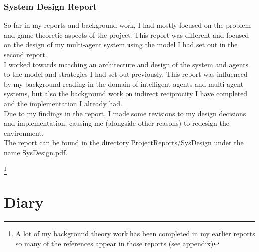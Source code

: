 \documentclass[]{final_report}
\begin{document}
\subsection{System Design Report}
\label{sub:sysdesign}
So far in my reports and background work, I had mostly focused on the problem and game-theoretic aspects of the project. This report was different and focused on the design of my multi-agent system using the model I had set out in the second report.\\
I worked towards matching an architecture and design of the system and agents to the model and strategies I had set out previously. This report was influenced by my background reading in the domain of intelligent agents and multi-agent systems, but also the background work on indirect reciprocity I have completed and the implementation I already had.\\
Due to my findings in the report, I made some revisions to my design decisions and implementation, causing me (alongside other reasons) to redesign the environment.\\
The report can be found in the directory ProjectReports/SysDesign under the name SysDesign.pdf.

\newpage
{}

\footnote{A lot of my background theory work has been completed in my earlier reports so many of the references appear in those reports (see appendix)}
\label{endpage}

\chapter{Diary}
\label{chapter:Diary}
\end{document}
